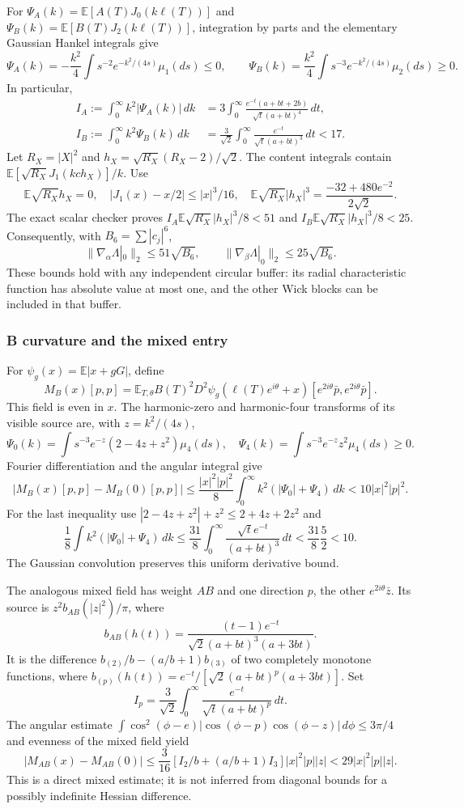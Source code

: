 For
$\Psi_A(k)=\mathbb E[A(T)J_0(k\ell(T))]$ and
$\Psi_B(k)=\mathbb E[B(T)J_2(k\ell(T))]$, integration by parts and the
elementary Gaussian Hankel integrals give
\[
 \Psi_A(k)=-\frac{k^2}{4}\int s^{-2}e^{-k^2/(4s)}\mu_1(ds)\le0,
 \qquad
 \Psi_B(k)=\frac{k^2}{4}\int s^{-3}e^{-k^2/(4s)}\mu_2(ds)\ge0.
\]
In particular,
\begin{align*}
 I_A:=\int_0^\infty k^2|\Psi_A(k)|\,dk
 &=3\int_0^\infty
 \frac{e^{-t}(a+bt+2b)}{\sqrt t(a+bt)^4}\,dt,\\
 I_B:=\int_0^\infty k^2\Psi_B(k)\,dk
 &=\frac3{\sqrt2}\int_0^\infty
 \frac{e^{-t}}{\sqrt t(a+bt)^3}\,dt<17.
\end{align*}
Let $R_X=|X|^2$ and $h_X=\sqrt{R_X}(R_X-2)/\sqrt2$. The content
integrals contain $\mathbb E[\sqrt{R_X}J_1(kch_X)]/k$.
Use
\[
 \mathbb E\sqrt{R_X}h_X=0,\quad
 |J_1(x)-x/2|\le|x|^3/16,\quad
 \mathbb E\sqrt{R_X}|h_X|^3
 =\frac{-32+480e^{-2}}{2\sqrt2}.
\]
The exact scalar checker proves
$I_A\mathbb E\sqrt{R_X}|h_X|^3/8<51$ and
$I_B\mathbb E\sqrt{R_X}|h_X|^3/8<25$. Consequently, with
$B_6=\sum|c_j|^6$,
\[
 \|\nabla_\alpha\Lambda|_0\|_2\le51\sqrt{B_6},\qquad
 \|\nabla_\beta\Lambda|_0\|_2\le25\sqrt{B_6}.
\]
These bounds hold with any independent circular buffer: its radial
characteristic function has absolute value at most one, and the other
Wick blocks can be included in that buffer.

\subsubsection{B curvature and the mixed entry}
For $\psi_g(x)=\mathbb E|x+gG|$, define
\[
 M_B(x)[p,p]=\mathbb E_{T,\theta}B(T)^2
 D^2\psi_g(\ell(T)e^{i\theta}+x)
 [e^{2i\theta}\bar p,e^{2i\theta}\bar p].
\]
This field is even in $x$. The harmonic-zero and harmonic-four
transforms of its visible source are, with $z=k^2/(4s)$,
\[
 \Psi_0(k)=\int s^{-3}e^{-z}(2-4z+z^2)\mu_4(ds),\quad
 \Psi_4(k)=\int s^{-3}e^{-z}z^2\mu_4(ds)\ge0.
\]
Fourier differentiation and the angular integral give
\[
 |M_B(x)[p,p]-M_B(0)[p,p]|
 \le\frac{|x|^2|p|^2}{8}
       \int_0^\infty k^2(|\Psi_0|+\Psi_4)\,dk
 <10|x|^2|p|^2.
\]
For the last inequality use
$|2-4z+z^2|+z^2\le2+4z+2z^2$ and
\[
 \frac18\int k^2(|\Psi_0|+\Psi_4)\,dk
 \le\frac{31}{8}\int_0^\infty
        \frac{\sqrt t e^{-t}}{(a+bt)^3}\,dt
 <\frac{31}{8}\frac52<10.
\]
The Gaussian convolution preserves this uniform derivative bound.

The analogous mixed field has weight $AB$ and one direction $p$,
the other $e^{2i\theta}\bar z$. Its source is $z^2b_{AB}(|z|^2)/\pi$,
where
\[
 b_{AB}(h(t))=
 \frac{(t-1)e^{-t}}{\sqrt2(a+bt)^3(a+3bt)}.
\]
It is the difference $b_{(2)}/b-(a/b+1)b_{(3)}$ of two completely
monotone functions, where
$b_{(p)}(h(t))=e^{-t}/[\sqrt2(a+bt)^p(a+3bt)]$.
Set
\[
 I_p=\frac3{\sqrt2}\int_0^\infty
          \frac{e^{-t}}{\sqrt t(a+bt)^p}\,dt.
\]
The angular estimate
$\int\cos^2(\phi-e)|\cos(\phi-p)\cos(\phi-z)|\,d\phi\le3\pi/4$
and evenness of the mixed field yield
\[
 |M_{AB}(x)-M_{AB}(0)|
 \le\frac3{16}\left[I_2/b+(a/b+1)I_3\right]|x|^2|p||z|
 <29|x|^2|p||z|.
\]
This is a direct mixed estimate; it is not inferred from diagonal
bounds for a possibly indefinite Hessian difference.

